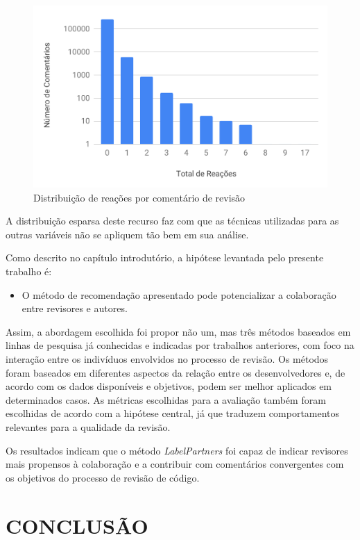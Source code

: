 \documentclass[12pt,openany,oneside,a4paper,english,brazil]{abntbibufjf}
\begin{document}
\begin{figure}[!htbp]
 \includegraphics[width=\textwidth]{dist-rc-reaction}
 \caption{Distribuição de reações por comentário de revisão}\label{fig:dist-rc-reaction}
\end{figure}

A distribuição esparsa deste recurso faz com que as técnicas utilizadas para as outras variáveis não se apliquem tão bem em sua análise.

Como descrito no capítulo introdutório, a hipótese levantada pelo presente trabalho é:

\begin{itemize}
  \item O método de recomendação apresentado pode potencializar a colaboração entre revisores e autores.
\end{itemize}

Assim, a abordagem escolhida foi propor não um, mas três métodos baseados em linhas de pesquisa já conhecidas e indicadas por trabalhos anteriores, com foco na interação entre os indivíduos envolvidos no processo de revisão. Os métodos foram baseados em diferentes aspectos da relação entre os desenvolvedores e, de acordo com os dados disponíveis e objetivos, podem ser melhor aplicados em determinados casos. As métricas escolhidas para a avaliação também foram escolhidas de acordo com a hipótese central, já que traduzem comportamentos relevantes para a qualidade da revisão.

Os resultados indicam que o método \textit{LabelPartners} foi capaz de indicar revisores mais propensos à colaboração e a contribuir com comentários convergentes com os objetivos do processo de revisão de código.

\chapter{CONCLUSÃO}\label{chap:conclusao}
\end{document}
